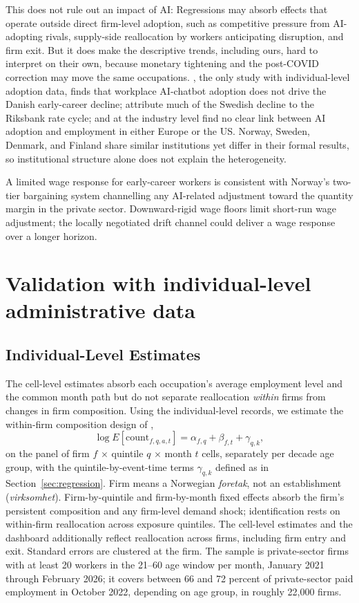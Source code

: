 \documentclass[12pt]{article}
\begin{document}
This does not rule out an impact of AI: Regressions may absorb effects that operate outside direct firm-level adoption, such as competitive pressure from AI-adopting rivals, supply-side reallocation by workers anticipating disruption, and firm exit. But it does make the descriptive trends, including ours, hard to interpret on their own, because monetary tightening and the post-COVID correction may move the same occupations. \citet{humlum2026}, the only study with individual-level adoption data, finds that workplace AI-chatbot adoption does not drive the Danish early-career decline; \citet{lodefalk2026} attribute much of the Swedish decline to the Riksbank rate cycle; and at the industry level \citet{bick2026} find no clear link between AI adoption and employment in either Europe or the US. Norway, Sweden, Denmark, and Finland share similar institutions yet differ in their formal results, so institutional structure alone does not explain the heterogeneity.

A limited wage response for early-career workers is consistent with Norway's two-tier bargaining system \citep{bhuller2022} channelling any AI-related adjustment toward the quantity margin in the private sector. Downward-rigid wage floors limit short-run wage adjustment; the locally negotiated drift channel could deliver a wage response over a longer horizon. 


\section{Validation with individual-level administrative data}\label{sec:validation}

\subsection{Individual-Level Estimates}\label{sec:regression:firmfe}

The cell-level estimates absorb each occupation's average employment level and the common month path but do not separate reallocation \emph{within} firms from changes in firm composition. Using the individual-level records, we estimate the within-firm composition design of \citet{brynjolfsson2025},
\[
\log E[\text{count}_{f,q,a,t}] = \alpha_{f,q} + \beta_{f,t} + \gamma_{q,k},
\]
on the panel of firm $f$ $\times$ quintile $q$ $\times$ month $t$ cells, separately per decade age group, with the quintile-by-event-time terms $\gamma_{q,k}$ defined as in Section~\ref{sec:regression}. Firm means a Norwegian \emph{foretak}, not an establishment (\emph{virksomhet}). Firm-by-quintile and firm-by-month fixed effects absorb the firm's persistent composition and any firm-level demand shock; identification rests on within-firm reallocation across exposure quintiles. The cell-level estimates and the dashboard additionally reflect reallocation across firms, including firm entry and exit. Standard errors are clustered at the firm. The sample is private-sector firms with at least 20 workers in the 21--60 age window per month, January 2021 through February 2026; it covers between 66 and 72 percent of private-sector paid employment in October 2022, depending on age group, in roughly 22,000 firms.
\end{document}

